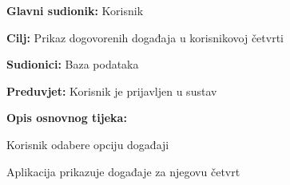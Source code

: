 					\noindent {}
					\begin{packed_item}
	
						\item \textbf{Glavni sudionik: }Korisnik
						\item  \textbf{Cilj:} Prikaz dogovorenih događaja u korisnikovoj četvrti
						\item  \textbf{Sudionici:} Baza podataka
						\item  \textbf{Preduvjet:} Korisnik je prijavljen u sustav
						\item  \textbf{Opis osnovnog tijeka:}
						
						\item[] \begin{packed_enum}
	
							\item Korisnik odabere opciju događaji
							\item Aplikacija prikazuje događaje za njegovu četvrt
						\end{packed_enum}
						
							
						\end{packed_item}
					\noindent {}
